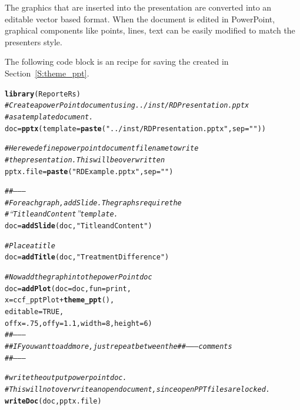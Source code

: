 \documentclass[nojss]{jss}\usepackage[]{graphicx}\usepackage[]{color}
\makeatletter
\newcommand{\hlnum}[1]{\textcolor[rgb]{0.686,0.059,0.569}{#1}}%
\newcommand{\hlstr}[1]{\textcolor[rgb]{0.192,0.494,0.8}{#1}}%
\newcommand{\hlcom}[1]{\textcolor[rgb]{0.678,0.584,0.686}{\textit{#1}}}%
\newcommand{\hlopt}[1]{\textcolor[rgb]{0,0,0}{#1}}%
\newcommand{\hlstd}[1]{\textcolor[rgb]{0.345,0.345,0.345}{#1}}%
\newcommand{\hlkwb}[1]{\textcolor[rgb]{0.69,0.353,0.396}{#1}}%
\newcommand{\hlkwc}[1]{\textcolor[rgb]{0.333,0.667,0.333}{#1}}%
\newcommand{\hlkwd}[1]{\textcolor[rgb]{0.737,0.353,0.396}{\textbf{#1}}}%
\newenvironment{kframe}{%
 \def\at@end@of@kframe{}%
 \ifinner\ifhmode%
  \def\at@end@of@kframe{\end{minipage}}%
  \begin{minipage}{\columnwidth}%
 \fi\fi%
 \def\FrameCommand##1{\hskip\@totalleftmargin \hskip-\fboxsep
 \colorbox{shadecolor}{##1}\hskip-\fboxsep
     \hskip-\linewidth \hskip-\@totalleftmargin \hskip\columnwidth}%
 \MakeFramed {\advance\hsize-\width
   \@totalleftmargin\z@ \linewidth\hsize
   \@setminipage}}%
 {\par\unskip\endMakeFramed%
 \at@end@of@kframe}
\newenvironment{knitrout}{}{} %
\makeatother
\begin{document}
The  graphics that are inserted into the presentation are converted into an editable vector based format. When the document is edited in PowerPoint, graphical components like points, lines, text can be easily modified to match the presenters style.

The following code block is an  recipe for saving the  created in Section~\ref{S:theme_ppt}. 
\begin{knitrout}\footnotesize
{}\color{fgcolor}\begin{kframe}
\begin{alltt}
\hlkwd{library}\hlstd{(ReporteRs)}
\hlcom{# Create a powerPoint document using ../inst/RDPresentation.pptx }
\hlcom{# as a template document.}
\hlstd{doc} \hlkwb{=} \hlkwd{pptx}\hlstd{(}\hlkwc{template}\hlstd{=}\hlkwd{paste}\hlstd{(}\hlstr{"../inst/RDPresentation.pptx"}\hlstd{,} \hlkwc{sep}\hlstd{=}\hlstr{""}\hlstd{))}

\hlcom{# Here we define powerpoint document filename to write}
\hlcom{# the presentation. This will be overwritten}
\hlstd{pptx.file} \hlkwb{=} \hlkwd{paste}\hlstd{(}\hlstr{"RDExample.pptx"}\hlstd{,} \hlkwc{sep}\hlstd{=}\hlstr{""}\hlstd{)}

\hlcom{##--------}
\hlcom{# For each graph, addSlide. The graphs require the }
\hlcom{# “Title and Content” template.}
\hlstd{doc} \hlkwb{=} \hlkwd{addSlide}\hlstd{( doc,} \hlstr{"Title and Content"} \hlstd{)}

\hlcom{# Place a title}
\hlstd{doc} \hlkwb{=} \hlkwd{addTitle}\hlstd{( doc,} \hlstr{"Treatment Difference"} \hlstd{)}

\hlcom{# Now add the graph into the powerPoint doc }
\hlstd{doc} \hlkwb{=} \hlkwd{addPlot}\hlstd{(} \hlkwc{doc}\hlstd{=doc,} \hlkwc{fun}\hlstd{=print,}
               \hlkwc{x}\hlstd{=ccf_pptPlot}\hlopt{+}\hlkwd{theme_ppt}\hlstd{() ,}
               \hlkwc{editable} \hlstd{=} \hlnum{TRUE}\hlstd{,}
               \hlkwc{offx}\hlstd{=}\hlnum{.75}\hlstd{,} \hlkwc{offy}\hlstd{=}\hlnum{1.1}\hlstd{,} \hlkwc{width}\hlstd{=}\hlnum{8}\hlstd{,} \hlkwc{height}\hlstd{=}\hlnum{6}\hlstd{)}
\hlcom{##--------}
\hlcom{## IF you want to add more, just repeat between the ##-------- comments}
\hlcom{##--------}

\hlcom{# write the output powerpoint doc. }
\hlcom{# This will not overwrite an open document, since open PPT files are locked.}
\hlkwd{writeDoc}\hlstd{( doc, pptx.file )}
\end{alltt}
\end{kframe}
\end{knitrout}
\end{document}
